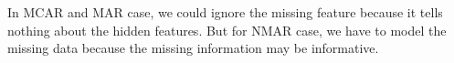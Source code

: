 In MCAR and MAR case, we could ignore the missing feature because it tells nothing about the hidden features. But for NMAR case, we have to model the missing data because the missing information may be informative.




































































